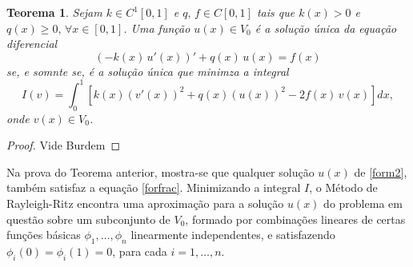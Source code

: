 \documentclass[12pt,a4paper]{report}
\newcommand{\dis}{\displaystyle}
\newtheorem{theorem}{Teorema}
\begin{document}
\begin{theorem}\label{teo1}
Sejam $k\in C^1[0,1]$ e $q,\,f\in C[0,1]$ tais que $k(x)>0$ e $q(x)\geq 0,\,\forall x\in[0,1]$. Uma função $u(x)\in V_0$ é a solução única da equação diferencial
\begin{equation}\label{form1}
\left(-k(x)\,u'(x)\right)' + q(x)\,u(x) = f(x)
\end{equation}
se, e somnte se, é a solução única que minimza a integral
\begin{equation}\label{form2}
I(v) = \dis\int_0^1\left[k(x)(v'(x))^2 + q(x)(u(x))^2 - 2f(x)\,v(x)\right]dx,
\end{equation}
onde $v(x)\in V_0$.
\end{theorem}
\begin{proof}
Vide Burdem
\end{proof}
Na prova do Teorema anterior, mostra-se que qualquer solução $u(x)$ de \eqref{form2}, também satisfaz a equação \eqref{forfrac}. Minimizando a integral $I$, o Método de Rayleigh-Ritz encontra uma aproximação para a solução $u(x)$ do problema em questão sobre um subconjunto de $V_0$, formado por combinações lineares de certas funções básicas $\phi_1,\dots,\phi_n$ linearmente independentes, e satisfazendo $\phi_i(0)=\phi_i(1)=0$, para cada $i=1,\dots,n$. 
\end{document}
